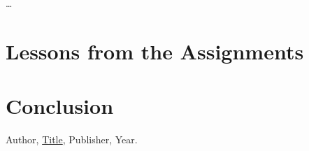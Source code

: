 \documentclass{article}
\theoremstyle{theorem}
\theoremstyle{definition}
\theoremstyle{remark}
\begin{document}
\ldots

\section{Lessons from the Assignments}





\section{Conclusion}\label{conclusion}


\begin{thebibliography}{99}
 Author, \href{https://en.wikipedia.org/wiki/LaTeX}{Title}, Publisher, Year.
\end{thebibliography}
\end{document}
